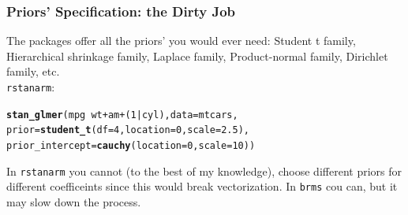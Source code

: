 \documentclass[handout]{beamer}\usepackage[]{graphicx}\usepackage[]{color}
\makeatletter
\newcommand{\hlnum}[1]{\textcolor[rgb]{0.686,0.059,0.569}{#1}}%
\newcommand{\hlopt}[1]{\textcolor[rgb]{0,0,0}{#1}}%
\newcommand{\hlstd}[1]{\textcolor[rgb]{0.345,0.345,0.345}{#1}}%
\newcommand{\hlkwc}[1]{\textcolor[rgb]{0.333,0.667,0.333}{#1}}%
\newcommand{\hlkwd}[1]{\textcolor[rgb]{0.737,0.353,0.396}{\textbf{#1}}}%
\newenvironment{kframe}{%
 \def\at@end@of@kframe{}%
 \ifinner\ifhmode%
  \def\at@end@of@kframe{\end{minipage}}%
  \begin{minipage}{\columnwidth}%
 \fi\fi%
 \def\FrameCommand##1{\hskip\@totalleftmargin \hskip-\fboxsep
 \colorbox{shadecolor}{##1}\hskip-\fboxsep
     \hskip-\linewidth \hskip-\@totalleftmargin \hskip\columnwidth}%
 \MakeFramed {\advance\hsize-\width
   \@totalleftmargin\z@ \linewidth\hsize
   \@setminipage}}%
 {\par\unskip\endMakeFramed%
 \at@end@of@kframe}
\newenvironment{knitrout}{}{} %
\makeatother
\begin{document}
\begin{frame}[fragile]
\frametitle{Priors' Specification: the Dirty Job}
The packages offer all the priors' you would ever need: Student t family, Hierarchical shrinkage family, Laplace family, Product-normal family, Dirichlet family, etc.\\
\pause
\texttt{rstanarm}: \\

\begin{knitrout}
\color{fgcolor}\begin{kframe}
\begin{alltt}
\hlkwd{stan_glmer}\hlstd{(mpg} \hlopt{~} \hlstd{wt} \hlopt{+} \hlstd{am} \hlopt{+} \hlstd{(}\hlnum{1}\hlopt{|}\hlstd{cyl),} \hlkwc{data} \hlstd{= mtcars,}
           \hlkwc{prior} \hlstd{=} \hlkwd{student_t}\hlstd{(}\hlkwc{df}\hlstd{=}\hlnum{4}\hlstd{,} \hlkwc{location}\hlstd{=}\hlnum{0}\hlstd{,} \hlkwc{scale}\hlstd{=}\hlnum{2.5}\hlstd{),}
           \hlkwc{prior_intercept} \hlstd{=} \hlkwd{cauchy}\hlstd{(}\hlkwc{location}\hlstd{=}\hlnum{0}\hlstd{,} \hlkwc{scale}\hlstd{=}\hlnum{10}\hlstd{))}
\end{alltt}
\end{kframe}
\end{knitrout}
\pause
In \texttt{rstanarm} you cannot (to the best of my knowledge), choose different priors for different coefficeints since this would break vectorization. In \texttt{brms} cou can, but it may slow down the process.

\end{frame}


\end{document}
